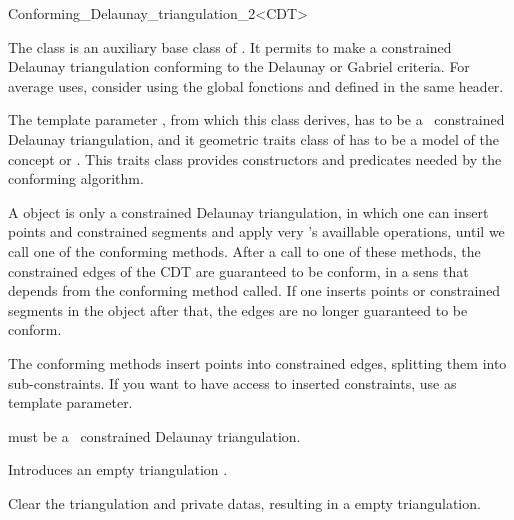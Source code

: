 \begin{ccRefClass}{Conforming_Delaunay_triangulation_2<CDT>}

The class \ccRefName{} is an auxiliary base class of
. It permits to make a constrained Delaunay
triangulation conforming to the Delaunay or Gabriel criteria. For average
uses, consider using the global fonctions 
and  defined in the same header.

The template parameter , from which this class derives, has to be a
\cgal\ constrained Delaunay triangulation, and it geometric traits class of
has to be a model of the concept
 or
. This traits class provides
constructors and predicates needed by the conforming algorithm.

A \ccRefName{} object is only a constrained Delaunay triangulation, in
which one can insert points and constrained segments and apply very
's availlable operations, until we call one of the conforming
methods. After a call to one of these methods, the constrained edges of the
CDT are guaranteed to be conform, in a sens that depends from the
conforming method called.  If one inserts points or constrained segments in
the \ccRefName{} object after that, the edges are no longer guaranteed to
be conform.

The conforming methods insert points into constrained edges, splitting 
them into sub-constraints. If you want to have access to inserted
constraints, use  as
template parameter.


\ccInheritsFrom


\ccParameters

 must be a \cgal\ constrained Delaunay triangulation.

\ccTypes 
{}

\ccCreation
{}

{Introduces an empty triangulation \ccVar.}

\ccOperations

{ Clear the triangulation and private datas, resulting in a empty
  triangulation. }


\end{ccRefClass}
